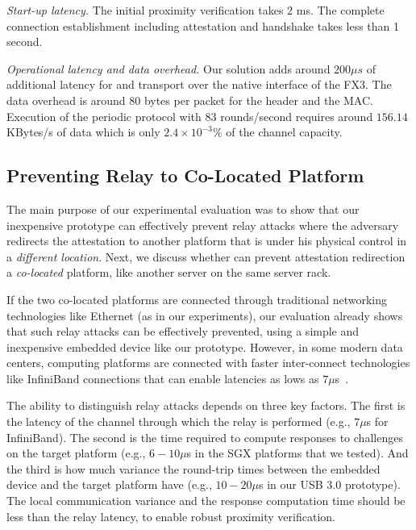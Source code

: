 \begin{mylist}
  \item \emph{Start-up latency.} The initial proximity verification takes $2$ ms. The complete connection establishment including attestation and \tls handshake takes less than 1 second.  
  


  \item \emph{Operational latency and data overhead.} Our solution adds around $200 \mu s$ of additional latency for \tls and transport over the native \usb interface of the FX3. The data overhead is around 80 bytes per packet for the header and the MAC. Execution of the periodic \name protocol with $83$ rounds/second requires around $156.14$ KBytes/s of data which is only $2.4 \times 10^{-3}$\% of the  channel capacity. 


\end{mylist}


\subsection{Preventing Relay to Co-Located Platform}
\label{sec:co-located}

The main purpose of our experimental evaluation was to show that our inexpensive \name prototype can effectively prevent relay attacks where the adversary redirects the attestation to another platform that is under his physical control in a \emph{different location}. Next, we discuss whether \name can prevent attestation redirection a \emph{co-located} platform, like another server on the same server rack.

If the two co-located platforms are connected through traditional networking technologies like Ethernet (as in our experiments), our evaluation already shows that such relay attacks can be effectively prevented, using a simple and inexpensive embedded device like our prototype. However, in some modern data centers, computing platforms are connected with faster inter-connect technologies like InfiniBand connections that can enable latencies as lows as $7 \mu$s~\cite{liu2003performance}. 

The ability to distinguish relay attacks depends on three key factors. The first is the latency of the channel through which the relay is performed (e.g., $7 \mu$s for InfiniBand). The second is the time required to compute responses to challenges on the target platform (e.g., $6-10 \mu$s in the SGX platforms that we tested). And the third is how much variance the round-trip times between the embedded device and the target platform have (e.g., $10-20 \mu$s in our USB 3.0 prototype). The local communication variance and the response computation time should be less than the relay latency, to enable robust proximity verification. 

